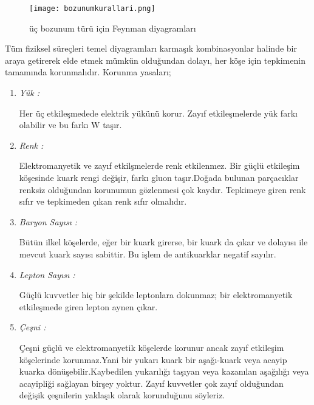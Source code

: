 \begin{figure}[!htpb]
\centering
\texttt{[image: bozunumkurallari.png]}
\caption{üç bozunum türü için Feynman diyagramları}
\end{figure}
Tüm fiziksel süreçleri temel diyagramları karmaşık kombinasyonlar halinde bir araya getirerek elde etmek mümkün olduğundan dolayı, her köşe için tepkimenin tamamında korunmalıdır. Korunma yasaları;

\begin{enumerate}
\item \emph{Yük : } 
\par Her üç etkileşmedede elektrik yükünü korur. Zayıf etkileşmelerde yük farkı olabilir ve bu farkı W taşır.
\item \emph{Renk : }
\par Elektromanyetik ve zayıf etkilşmelerde renk etkilenmez. Bir güçlü etkileşim köşesinde kuark rengi değişir, farkı gluon taşır.Doğada bulunan parçacıklar renksiz olduğundan korunumun gözlenmesi çok kaydır. Tepkimeye giren renk sıfır ve tepkimeden çıkan renk sıfır olmalıdır.

\item \emph{Baryon Sayısı : }
\par Bütün ilkel köşelerde, eğer bir kuark girerse, bir kuark da çıkar ve dolayısı ile mevcut kuark sayısı sabittir. Bu işlem de antikuarklar negatif sayılır.

\item \emph{Lepton Sayısı : }
\par Güçlü kuvvetler hiç bir şekilde leptonlara dokunmaz; bir elektromanyetik etkileşmede giren lepton aynen çıkar.

\item \emph{Çeşni : }
\par Çeşni güçlü ve elektromanyetik köşelerde korunur ancak zayıf etkileşim köşelerinde korunmaz.Yani bir yukarı kuark bir aşağı-kuark veya acayip kuarka dönüşebilir.Kaybedilen yukarılığı taşıyan veya kazanılan aşağılığı veya acayipliği sağlayan birşey yoktur. Zayıf kuvvetler çok zayıf olduğundan değişik çeşnilerin yaklaşık olarak korunduğunu söyleriz.

\end{enumerate}
